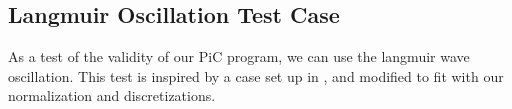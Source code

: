 \subsection{Langmuir Oscillation Test Case}
\label{sec:langmuir_verification}
As a test of the validity of our PiC program, we can use the langmuir wave
oscillation. This test is inspired by a case set up in \citet{birdsall_plasma_2004},
and modified to fit with our normalization and discretizations.
